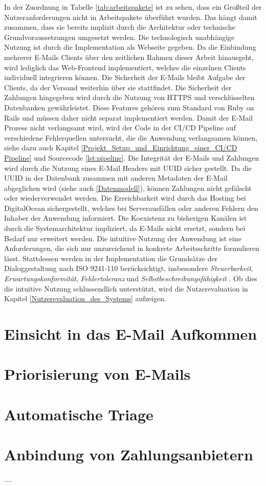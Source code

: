 In der Zuordnung in Tabelle \ref{tab:arbeitspakete} ist zu sehen, dass ein Großteil der Nutzeranforderungen nicht in Arbeitspakete überführt wurden. Das hängt damit zusammen, dass sie bereits implizit durch die Architektur oder technische Grundvoraussetzungen umgesetzt werden. Die technologisch unabhängige Nutzung ist durch die Implementation als Webseite gegeben. Da die Einbindung mehrerer E-Mails Clients über den zeitlichen Rahmen dieser Arbeit hinausgeht, wird lediglich das Web-Frontend implementiert, welches die einzelnen Clients individuell integrieren können. Die Sicherheit der E-Mails bleibt Aufgabe der Clients, da der Versand weiterhin über sie stattfindet. Die Sicherheit der Zahlungen hingegeben wird durch die Nutzung von HTTPS und verschlüsselten Datenbanken gewährleistet. Diese Features gehören zum Standard von Ruby on Rails und müssen daher nicht separat implementiert werden. Damit der E-Mail Prozess nicht verlangsamt wird, wird der Code in der CI/CD Pipeline auf verschiedene Fehlerquellen untersucht, die die Anwendung verlangsamen können, siehe dazu auch Kapitel \ref{Projekt_Setup_und_Einrichtung_einer_CI/CD Pipeline} und Sourcecode \ref{lst:pipeline}. Die Integrität der E-Mails und Zahlungen wird durch die Nutzung eines E-Mail Headers mit UUID sicher gestellt. Da die UUID in der Datenbank zusammen mit anderen Metadaten der E-Mail abgeglichen wird (siehe auch \ref{Datenmodell}), können Zahlungen nicht gefälscht oder wiederverwendet werden. Die Erreichbarkeit wird durch das Hosting bei DigitalOcean sichergestellt, welches bei Serverausfällen oder anderen Fehlern den Inhaber der Anwendung informiert. Die Koexistenz zu bisherigen Kanälen ist durch die Systemarchitektur impliziert, da E-Mails nicht ersetzt, sondern bei Bedarf nur erweitert werden. Die intuitive Nutzung der Anwendung ist eine Anforderungen, die sich nur unzureichend in konkrete Arbeitsschritte formulieren lässt. Stattdessen werden in der Implementation die Grundsätze der Dialoggestaltung nach ISO 9241-110 berücksichtigt, insbesondere \textit{Steuerbarkeit}, \textit{Erwartungskonformität}, \textit{Fehlertoleranz} und \textit{Selbstbeschreibungsfähigkeit} \citep{ISO9241-110}. Ob dies die intuitive Nutzung schlussendlich unterstützt, wird die Nutzerevaluation in Kapitel \ref{Nutzerevaluation_des_Systems} aufzeigen. 

\section{Einsicht in das E-Mail Aufkommen}

\section{Priorisierung von E-Mails}

\section{Automatische Triage}

\section{Anbindung von Zahlungsanbietern}
....